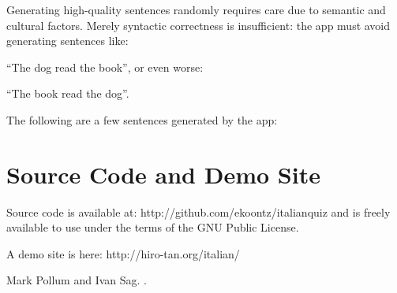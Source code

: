 \documentclass[11pt]{article}
\begin{document}
Generating high-quality sentences randomly requires care due to
semantic and cultural factors. Merely syntactic correctness is
insufficient: the app must avoid generating sentences like:

``The dog read the book'', or even worse:

``The book read the dog''. 

The following are a few sentences generated by the app:


\section{Source Code and Demo Site}

Source code is available at: http://github.com/ekoontz/italianquiz and
is freely available to use under the terms of the GNU Public License.

A demo site is here: http://hiro-tan.org/italian/

\begin{thebibliography}{}

Mark Pollum and Ivan Sag.
.

\end{thebibliography}
\end{document}
